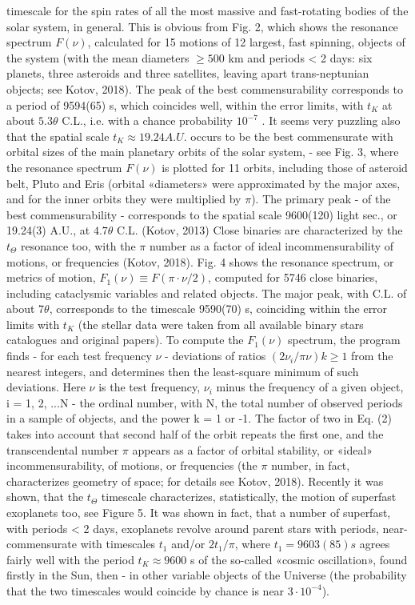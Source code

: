 \documentclass[twoside,draft]{article}
\begin{document}
\begin{sloppypar}
{timescale for the spin rates of all the most massive and fast-rotating bodies of the solar system, in
general.
This is obvious from Fig. 2, which shows the resonance spectrum $F( \nu )$, calculated for 15
motions of 12 largest, fast spinning, objects of the system (with the mean diameters $\geq 500$ km and
periods < 2 days: six planets, three asteroids and three satellites, leaving apart trans-neptunian
objects; see Kotov, 2018). The peak of the best commensurability corresponds to a period of
9594(65) s, which coincides well, within the error limits, with $t_K$ at about $5.3 \theta$ C.L., i.e. with a
chance probability $10^{-7}$ .
It seems very puzzling also that the spatial scale $t_{K} \approx 19.24 A.U.$ occurs to be the best
commensurate with orbital sizes of the main planetary orbits of the solar system, - see Fig. 3,
where the resonance spectrum $F( \nu )$ is plotted for 11 orbits, including those of asteroid belt, Pluto
and Eris (orbital «diameters» were approximated by the major axes, and for the inner orbits they
were multiplied by $\pi$). The primary peak - of the best commensurability - corresponds to the
spatial scale 9600(120) light sec., or 19.24(3) A.U., at $4.7 \theta$ C.L. (Kotov, 2013)
Close binaries are characterized by the $t_{\Theta}$ resonance too, with the $\pi$ number as a factor of ideal
incommensurability of motions, or frequencies (Kotov, 2018). Fig. 4 shows the resonance spectrum,
or metrics of motion, $F_{1} (\nu) \equiv F(\pi \cdot \nu/2)$, computed for 5746 close binaries, including cataclysmic
variables and related objects. The major peak, with C.L. of about $7 \theta$, corresponds to the timescale
9590(70) s, coinciding within the error limits with $t_{K}$ (the stellar data were taken from all available
binary stars catalogues and original papers).
To compute the $F_{1} (\nu)$ spectrum, the program finds - for each test frequency $\nu$ - deviations of
ratios $(2\nu_{i} /\pi \nu) k \geq 1$ from the nearest integers, and determines then the least-square minimum of such
deviations. Here $\nu$ is the test frequency, $\nu_{i}$ minus the frequency of a given object, i = 1, 2, ...N - the
ordinal number, with N, the total number of observed periods in a sample of objects, and the power
k = 1 or -1. The factor of two in Eq. (2) takes into account that second half of the orbit repeats the
first one, and the transcendental number $\pi$ appears as a factor of orbital stability, or «ideal»
incommensurability, of motions, or frequencies (the $\pi$ number, in fact, characterizes geometry of
space; for details see Kotov, 2018).
Recently it was shown, that the $t_{\Theta}$ timescale characterizes, statistically, the motion of superfast
exoplanets too, see Figure 5.
It was shown in fact, that a number of superfast, with periods < 2 days, exoplanets revolve
around parent stars with periods, near-commensurate with timescales $t_{1}$ and/or $2 t_{1}/\pi$, where $t_{1} =
9603(85) s$ agrees fairly well with the period $t_{K} \approx 9600$ s of the so-called «cosmic oscillation», found
firstly in the Sun, then - in other variable objects of the Universe (the probability that the two
timescales would coincide by chance is near $3 \cdot 10^{-4}$).

}
\end{sloppypar}
\end{document}
